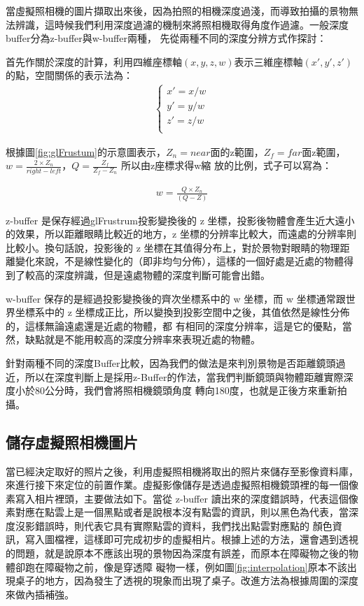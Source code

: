 	當虛擬照相機的圖片擷取出來後，因為拍照的相機深度過淺，而導致拍攝的景物無法辨識，這時候我們利用深度過濾的機制來將照相機取得角度作過濾。一般深度buffer分為z-buffer與w-buffer兩種，
	先從兩種不同的深度分辨方式作探討：
	
	首先作關於深度的計算，利用四維座標軸$(x,y,z,w)$表示三維座標軸$(x',y',z')$的點，空間關係的表示法為：
	\begin{align}
		\left\{
		\begin{array}{ccc}
		x' = x /w \\
		y' = y /w \\
		z' = z /w \\
		\end{array}
		\right.
	\end{align}
	
	根據圖\ref{fig:glFrustum}的示意圖表示，$Z_n = near$面的z範圍，$Z_f = far$面z範圍，$w = \frac{2 \times Z_n}{right-left}$，$Q = \frac{Z_f}{Z_f - Z_n}$ 所以由z座標求得w縮
	放的比例，式子可以寫為：
		
	\begin{align}
		w = \frac{Q\times Z_n}{(Q-Z)}
	\end{align}			
	
	z-buffer 是保存經過glFrustrum投影變換後的 z 坐標，投影後物體會產生近大遠小的效果，所以距離眼睛比較近的地方，z 坐標的分辨率比較大，而遠處的分辨率則比較小。換句話說，投影後的
    z 坐標在其值得分布上，對於景物對眼睛的物理距離變化來說，不是線性變化的（即非均勻分佈），這樣的一個好處是近處的物體得到了較高的深度辨識，但是遠處物體的深度判斷可能會出錯。 
    
    w-buffer 保存的是經過投影變換後的齊次坐標系中的 w 坐標，而 w 坐標通常跟世界坐標系中的 z 坐標成正比，所以變換到投影空間中之後，其值依然是線性分佈的，這樣無論遠處還是近處的物體，都
    有相同的深度分辨率，這是它的優點，當然，缺點就是不能用較高的深度分辨率來表現近處的物體。
    
    針對兩種不同的深度Buffer比較，因為我們的做法是來判別景物是否距離鏡頭過近，所以在深度判斷上是採用z-Buffer的作法，當我們判斷鏡頭與物體距離實際深度小於80公分時，我們會將照相機鏡頭角度
    轉向180度，也就是正後方來重新拍攝。
    

\subsection{儲存虛擬照相機圖片}
%
	當已經決定取好的照片之後，利用虛擬照相機將取出的照片來儲存至影像資料庫，來進行接下來定位的前置作業。虛擬影像儲存是透過虛擬照相機鏡頭裡的每一個像素寫入相片裡頭，主要做法如下。當從 
	z-buffer 讀出來的深度錯誤時，代表這個像素對應在點雲上是一個黑點或者是說根本沒有點雲的資訊，則以黑色為代表，當深度沒影錯誤時，則代表它具有實際點雲的資料，我們找出點雲對應點的
	顏色資訊，寫入圖檔裡，這樣即可完成初步的虛擬相片。根據上述的方法，還會遇到透視的問題，就是說原本不應該出現的景物因為深度有誤差，而原本在障礙物之後的物體卻跑在障礙物之前，像是穿透障
	礙物一樣，例如圖\ref{fig:interpolation}原本不該出現桌子的地方，因為發生了透視的現象而出現了桌子。改進方法為根據周圍的深度來做內插補強。
	
